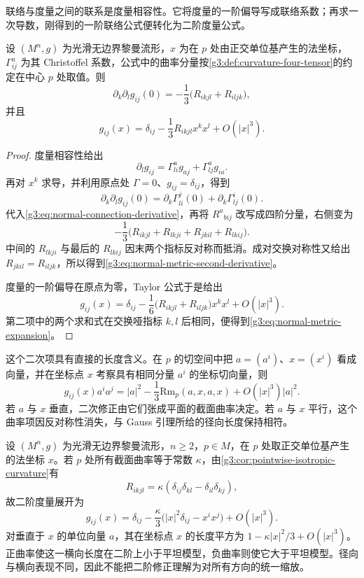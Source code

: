 联络与度量之间的联系是度量相容性。它将度量的一阶偏导写成联络系数；再求一次导数，刚得到的一阶联络公式便转化为二阶度量公式。

\begin{theorem}\label{g3:thm:normal-metric-expansion}
	设 \((M^n,g)\) 为光滑无边界黎曼流形，\(x\) 为在 \(p\) 处由正交单位基产生的法坐标，\(\Gamma^a_{ij}\) 为其 Christoffel 系数，公式中的曲率分量按\cref{g3:def:curvature-four-tensor}的约定在中心 \(p\) 处取值。则
	\begin{equation}\label{g3:eq:normal-metric-second-derivative}
		\partial_k\partial_lg_{ij}(0)
		=-\frac13\bigl(R_{ikjl}+R_{iljk}\bigr),
	\end{equation}
	并且
	\begin{equation}\label{g3:eq:normal-metric-expansion}
		g_{ij}(x)=\delta_{ij}-\frac13R_{ikjl}x^kx^l+O(|x|^3).
	\end{equation}
\end{theorem}
\begin{proof}
	度量相容性给出
	\[
		\partial_lg_{ij}=\Gamma^a_{li}g_{aj}+\Gamma^a_{lj}g_{ia}.
	\]
	再对 \(x^k\) 求导，并利用原点处 \(\Gamma=0\)、\(g_{ij}=\delta_{ij}\)，得到
	\[
		\partial_k\partial_lg_{ij}(0)
		=\partial_k\Gamma^j_{li}(0)+\partial_k\Gamma^i_{lj}(0).
	\]
	代入\eqref{g3:eq:normal-connection-derivative}，再将 \(R^a{}_{b i j}\) 改写成四阶分量，右侧变为
	\[
		-\frac13\bigl(R_{ikjl}+R_{lkji}+R_{jkil}+R_{lkij}\bigr).
	\]
	中间的 \(R_{lkji}\) 与最后的 \(R_{lkij}\) 因末两个指标反对称而抵消。成对交换对称性又给出 \(R_{jkil}=R_{iljk}\)，所以得到\eqref{g3:eq:normal-metric-second-derivative}。

	度量的一阶偏导在原点为零，Taylor 公式于是给出
	\[
		g_{ij}(x)=\delta_{ij}
		-\frac16\bigl(R_{ikjl}+R_{iljk}\bigr)x^kx^l+O(|x|^3).
	\]
	第二项中的两个求和式在交换哑指标 \(k,l\) 后相同，便得到\eqref{g3:eq:normal-metric-expansion}。
\end{proof}

这个二次项具有直接的长度含义。在 \(p\) 的切空间中把 \(a=(a^i)\)、\(x=(x^i)\) 看成向量，并在坐标点 \(x\) 考察具有相同分量 \(a^i\) 的坐标切向量，则
\[
	g_{ij}(x)a^ia^j
	=|a|^2-\frac13\mathrm{Rm}_p(a,x,a,x)
	+O(|x|^3)|a|^2.
\]
若 \(a\) 与 \(x\) 垂直，二次修正由它们张成平面的截面曲率决定。若 \(a\) 与 \(x\) 平行，这个曲率项因反对称性消失，与 Gauss 引理所给的径向长度保持相符。

\begin{example}\label{g3:exm:constant-curvature-normal-quadratic}
	设 \((M^n,g)\) 为光滑无边界黎曼流形，\(n\ge2\)，\(p\in M\)，在 \(p\) 处取正交单位基产生的法坐标 \(x\)。若 \(p\) 处所有截面曲率等于常数 \(\kappa\)，由\cref{g3:cor:pointwise-isotropic-curvature}有
	\[
		R_{ikjl}=\kappa(\delta_{ij}\delta_{kl}-\delta_{il}\delta_{kj}),
	\]
	故二阶度量展开为
	\[
		g_{ij}(x)=\delta_{ij}
		-\frac{\kappa}{3}\bigl(|x|^2\delta_{ij}-x^ix^j\bigr)+O(|x|^3).
	\]
	对垂直于 \(x\) 的单位向量 \(a\)，其在坐标点 \(x\) 的长度平方为 \(1-\kappa|x|^2/3+O(|x|^3)\)。正曲率使这一横向长度在二阶上小于平坦模型，负曲率则使它大于平坦模型。径向与横向表现不同，因此不能把二阶修正理解为对所有方向的统一缩放。
\end{example}

